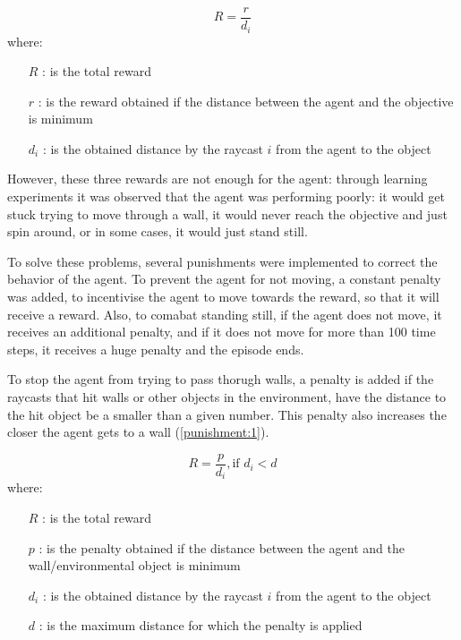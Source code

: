 \begin{equation} \label{reward:2}
    R = \frac{r}{d_{i}}
\end{equation}
where:
\begin{itemize}
    \item [$R$]: is the total reward
    \item [$r$]: is the reward obtained if the distance between the agent and the objective is minimum
    \item [$d_{i}$]: is the obtained distance by the raycast $i$ from the agent to the object
\end{itemize}

However, these three rewards are not enough for the agent: through learning experiments it was observed that the agent was performing poorly: it would get stuck trying to move through a wall, it would never reach the objective and just spin around, or in some cases, it would just stand still.

To solve these problems, several punishments were implemented to correct the behavior of the agent. To prevent the agent for not moving, a constant penalty was added, to incentivise the agent to move towards the reward, so that it will receive a reward. Also, to comabat standing still, if the agent does not move, it receives an additional penalty, and if it does not move for more than 100 time steps, it receives a huge penalty and the episode ends. 

To stop the agent from trying to pass thorugh walls, a penalty is added if the raycasts that hit walls or other objects in the environment, have the distance to the hit object be a smaller than a given number. This penalty also increases the closer the agent gets to a wall (\ref{punishment:1}). 

\begin{equation} \label{punishment:1}
    R = \frac{p}{d_{i}}, \text{if } d_{i} < d
\end{equation}
where:
\begin{itemize}
    \item [$R$]: is the total reward
    \item [$p$]: is the penalty obtained if the distance between the agent and the wall/environmental object is minimum
    \item [$d_{i}$]: is the obtained distance by the raycast $i$ from the agent to the object
    \item [$d$]: is the maximum distance for which the penalty is applied
\end{itemize}

